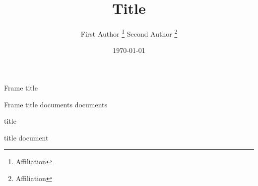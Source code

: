 \documentclass[dvipdfmx,fleqn]{beamer}
\title{Title}
\author{First Author \thanks{Affiliation}
	\quad Second Author \thanks{Affiliation}
}
\date{\today}
\begin{document}
\begin{frame}
	\titlepage
\end{frame}

\begin{frame}{Frame title}
	\begin{tblock}{Frame title}
		documents
		documents
	\end{tblock}
\end{frame}

\begin{frame}{title}
	\begin{dblock}{title}
		document
	\end{dblock}
\end{frame}
\end{document}
